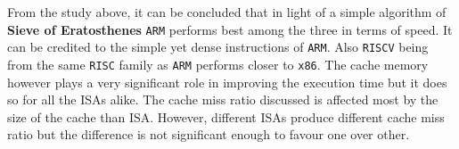 From the study above, it can be concluded that in light of a simple algorithm of \textbf{Sieve of Eratosthenes}
\texttt{ARM} performs best among the three in terms of speed. It can be credited to the simple yet 
dense instructions of \texttt{ARM}. Also \texttt{RISCV} being from the same \texttt{RISC} family as \texttt{ARM}
performs closer to \texttt{x86}. The cache memory however plays a very significant role in improving
the execution time but it does so for all the ISAs alike. The cache miss ratio discussed is affected most
by the size of the cache than ISA. However, different ISAs produce different cache miss ratio but the 
difference is not significant enough to favour one over other.  